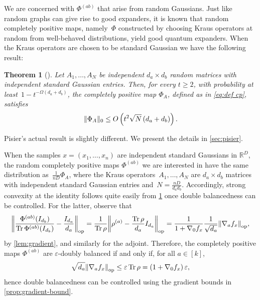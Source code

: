 \documentclass[aos]{imsart}
\newtheorem{theorem}{Theorem}[section]
\theoremstyle{definition}
\numberwithin{equation}{section}
\DeclareMathOperator{\op}{op}
\DeclareMathOperator{\tr}{Tr}
\DeclarePairedDelimiter{\norm}{\lVert}{\rVert}
\newcommand{\R}{{\mathbb{R}}}
\newcommand{\eps}{\varepsilon}
\begin{document}
We are concerned with $\Phi^{(ab)}$ that arise from random Gaussians.
Just like random graphs can give rise to good expanders, it is known that random completely positive maps, namely~$\Phi$ constructed by choosing Kraus operators at random from well-behaved distributions, yield good quantum expanders.
When the Kraus operators are chosen to be standard Gaussian we have the following result:

\begin{theorem}[\cite{pisier2012grothendieck,P14}]\label{thm:hess-pisier}
Let $A_1,\dots,A_N$ be independent $d_a\times d_b$ random matrices with independent standard Gaussian entries.
Then, for every $t \geq 2$, with probability at least~$1 - t^{-\Omega(d_a + d_b)}$, the completely positive map $\Phi_A$, defined as in \cref{eq:def cp}, satisfies
\begin{align*}
  \norm{\Phi_A}_0 \leq O\left(t^{2} \sqrt N \left( d_a + d_b \right)\right).
\end{align*}
\end{theorem}

Pisier's actual result is slightly different.
We present the details in \cref{sec:pisier}.

When the samples $x=(x_1,\dots,x_n)$ are independent standard Gaussians in $\R^D$,
the random completely positive maps $\Phi^{(ab)}$ we are interested in have the same distribution as~$\frac1{nD}\Phi_A$, where the Kraus operators~$A_1,\dots,A_N$ are $d_a \times d_b$ matrices with independent standard Gaussian entries and~$N=\frac{nD}{d_ad_b}$.
Accordingly, strong convexity at the identity follows quite easily from \cref{thm:hess-pisier} once double balancedness can be controlled.
For the latter, observe that
\begin{align*}
  \norm*{\frac{\Phi^{(ab)}(I_{d_b})}{\tr \Phi^{(ab)}(I_{d_b})} - \frac{I_{d_a}}{d_a}}_{\op}
= \frac1{\tr\rho} \norm*{\rho^{(a)} - \frac{\tr \rho}{d_a} I_{d_a}}_{\op}
= \frac1{1 + \nabla_0 f_x} \frac1{\sqrt{d_a}} \norm*{\nabla_a f_x}_{\op},
\end{align*}
by \cref{lem:gradient}, and similarly for the adjoint.
Therefore, the completely positive maps $\Phi^{(ab)}$ are $\eps$-doubly balanced if and only if, for all $a\in[k]$,
\begin{align}\label{eq:balanced via grad}
  \sqrt{d_a} \norm*{\nabla_a f_x}_{\op} \leq \eps \tr \rho = \left( 1 + \nabla_0 f_x \right) \eps,
\end{align}
hence double balancedness can be controlled using the gradient bounds in \cref{prop:gradient-bound}.
\end{document}
